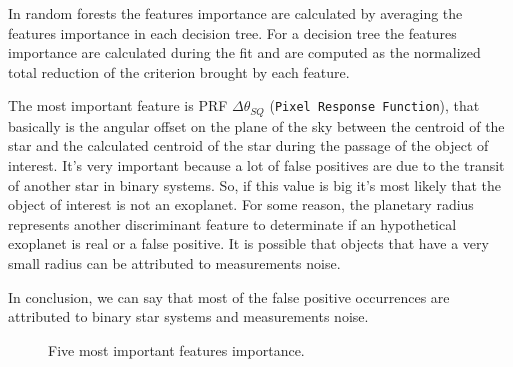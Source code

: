 \documentclass[11pt, a4paper]{article}
\begin{document}
  In random forests the features importance are calculated by averaging the features importance in each decision tree.
  For a decision tree the features importance are calculated during the fit and are computed as the normalized total reduction of the criterion brought by each feature. 

  The most important feature is PRF $\Delta\theta_{SQ}$ (\texttt{Pixel Response Function}), that basically is the angular offset on the plane of the sky between the centroid of the star and the calculated centroid of the star during the passage of the object of interest.
  It's very important because a lot of false positives are due to the transit of another star in binary systems.
  So, if this value is big it's most likely that the object of interest is not an exoplanet.
  For some reason, the planetary radius represents another discriminant feature to determinate if an hypothetical exoplanet is real or a false positive.
  It is possible that objects that have a very small radius can be attributed to measurements noise.

  In conclusion, we can say that most of the false positive occurrences are attributed to binary star systems and measurements noise.

  \begin{figure}
    \centering
    \caption{Five most important features importance.}
    \label{figure:importances}
  \end{figure}

\clearpage
\appendix
\appendixpage
\end{document}
